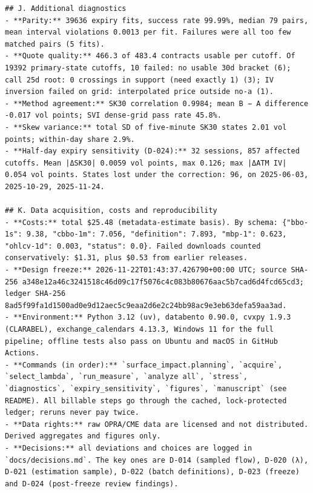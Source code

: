 \documentclass[11pt]{article}
\begin{document}
\begin{verbatim}
## J. Additional diagnostics
- **Parity:** 39636 expiry fits, success rate 99.99%, median 79 pairs, mean interval violations 0.0013 per fit. Failures were all too few matched pairs (5 fits).
- **Quote quality:** 466.3 of 483.4 contracts usable per cutoff. Of 19392 primary-state cutoffs, 10 failed: no usable 30d bracket (6); call 25d root: 0 crossings in support (need exactly 1) (3); IV inversion failed on grid: interpolated price outside no-a (1).
- **Method agreement:** SK30 correlation 0.9984; mean B − A difference -0.017 vol points; SVI dense-grid pass rate 45.8%.
- **Skew variance:** total SD of five-minute SK30 states 2.01 vol points; within-day share 2.9%.
- **Half-day expiry sensitivity (D-024):** 32 sessions, 857 affected cutoffs. Mean |ΔSK30| 0.0059 vol points, max 0.126; max |ΔATM IV| 0.054 vol points. States lost under the correction: 96, on 2025-06-03, 2025-10-29, 2025-11-24.

## K. Data acquisition, costs and reproducibility
- **Costs:** total $25.48 (metadata-estimate basis). By schema: {"bbo-1s": 9.38, "cbbo-1m": 7.056, "definition": 7.893, "mbp-1": 0.623, "ohlcv-1d": 0.003, "status": 0.0}. Failed downloads counted conservatively: $1.31, plus $0.53 from earlier releases.
- **Design freeze:** 2026-11-22T01:43:37.426790+00:00 UTC; source SHA-256 a348e12a46c3241518c46d09c17f5076c4c083b80676aac5b7cad6d4fcd65cd3; ledger SHA-256 8ad5f99fa1d1500ad0e9d12aec5c9eaa2d6e2c24bb98ac9e3eb63defa59aa3ad.
- **Environment:** Python 3.12 (uv), databento 0.90.0, cvxpy 1.9.3 (CLARABEL), exchange_calendars 4.13.3, Windows 11 for the full pipeline; offline tests also pass on Ubuntu and macOS in GitHub Actions.
- **Commands (in order):** `surface_impact.planning`, `acquire`, `select_lambda`, `run_measure`, `analyze all`, `stress`, `diagnostics`, `expiry_sensitivity`, `figures`, `manuscript` (see README). All billable steps go through the cached, lock-protected ledger; reruns never pay twice.
- **Data rights:** raw OPRA/CME data are licensed and not distributed. Derived aggregates and figures only.
- **Decisions:** all deviations and choices are logged in `docs/decisions.md`. The key ones are D-014 (sampled flow), D-020 (λ), D-021 (estimation sample), D-022 (batch definitions), D-023 (freeze) and D-024 (post-freeze review findings).

\end{verbatim}

\nocite{*}
\end{document}
